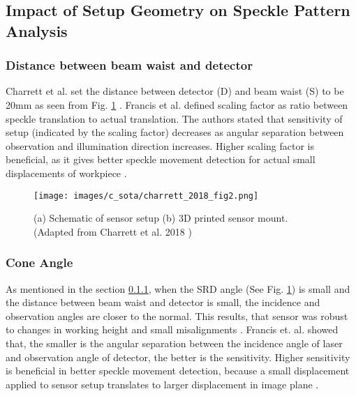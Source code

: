 \subsection{Impact of Setup Geometry on Speckle Pattern Analysis}

    \subsubsection{Distance between beam waist and detector}\label{Subsubsection:Distance_Beam_Waist_Detector}
    Charrett et al. set the distance between detector (D) and beam waist (S) to be 20mm as seen from Fig. \ref{fig:charrett_2018_fig2} \cite{charrett_2018}. Francis et al. \cite{francis_autonomous} defined scaling factor as ratio between speckle translation to actual translation. The authors stated that sensitivity of setup (indicated by the scaling factor) decreases as angular separation between observation and illumination direction increases. Higher scaling factor is beneficial, as it gives better speckle movement detection for actual small displacements of workpiece \cite{francis_autonomous}.

    \begin{figure}[h]
        \centering
        \texttt{[image: images/c\_sota/charrett\_2018\_fig2.png]}
        \caption{(a) Schematic of sensor setup (b) 3D printed sensor mount. (Adapted from Charrett et al. 2018 \cite{charrett_2018})}
        \label{fig:charrett_2018_fig2}
    \end{figure}


    \subsubsection{Cone Angle}
    As mentioned in the section \ref{Subsubsection:Distance_Beam_Waist_Detector}, when the SRD angle (See Fig. \ref{fig:charrett_2018_fig2}) is small and the distance between beam waist and detector is small, the incidence and observation angles are closer to the normal. This results, that sensor was robust to changes in working height and small misalignments \cite{charrett_2018}. Francis et. al. showed that, the smaller is the angular separation between the incidence angle of laser and observation angle of detector, the better is the sensitivity. Higher sensitivity is beneficial in better speckle movement detection, because a small displacement applied to sensor setup translates to larger displacement in image plane \cite{francis_autonomous}.
    
